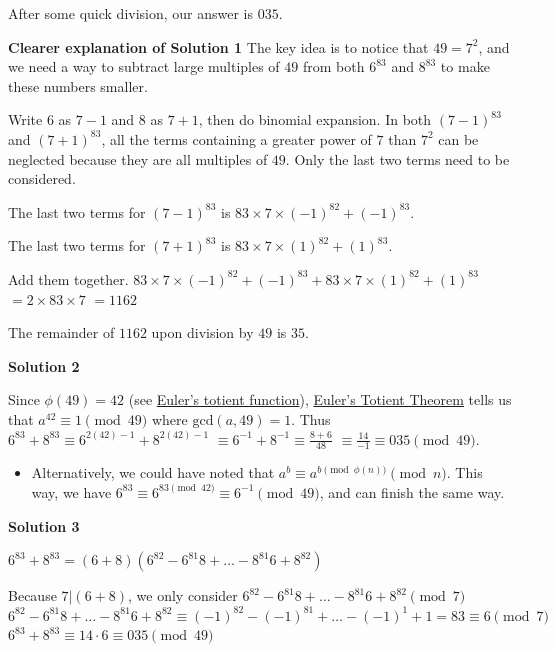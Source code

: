 \begin{enumerate}
 After some quick division, our answer is $\boxed{035}$.

 \textbf{Clearer explanation of Solution 1} The key idea is to notice that $49=7^2$, and we need a way to subtract large multiples of $49$ from both $6^{83}$ and $8^{83}$ to make these numbers smaller.

 
Write $6$ as $7-1$ and $8$ as $7+1$, then do binomial expansion. In both $(7-1)^{83}$ and $(7+1)^{83}$, all the terms containing a greater power of $7$ than $7^2$ can be neglected because they are all multiples of $49$. Only the last two terms need to be considered.

 
The last two terms for $(7-1)^{83}$ is $83\times{7}\times{(-1)^{82}}+(-1)^{83}$.

 The last two terms for $(7+1)^{83}$ is $83\times{7}\times{(1)^{82}}+(1)^{83}$.

 
Add them together. $83\times{7}\times{(-1)^{82}}+(-1)^{83}+83\times{7}\times{(1)^{82}}+(1)^{83}$
$=2\times 83\times 7$
$=1162$

 
The remainder of $1162$ upon division by $49$ is $35$.

 



\textbf{Solution 2}

Since $\phi(49) = 42$ (see \href{https://artofproblemsolving.com/wiki/index.php?title=Euler\%27s\_totient\_function}{Euler's totient function}), \href{https://artofproblemsolving.com/wiki/index.php?title=Euler\%27s\_Totient\_Theorem}{Euler's Totient Theorem} tells us that $a^{42} \equiv 1 \pmod{49}$ where $\text{gcd}(a,49) = 1$. Thus $6^{83} + 8^{83} \equiv 6^{2(42)-1}+8^{2(42)-1}$ $\equiv 6^{-1} + 8^{-1} \equiv \frac{8+6}{48}$ $\equiv \frac{14}{-1}\equiv \boxed{035} \pmod{49}$.

 
            \begin{itemize}
        \item Alternatively, we could have noted that $a^b\equiv a^{b\pmod{\phi{(n)}}}\pmod n$. This way, we have $6^{83}\equiv 6^{83\pmod {42}}\equiv 6^{-1}\pmod {49}$, and can finish the same way.
            \end{itemize}
            



\textbf{Solution 3}

$6^{83} + 8^{83} = (6+8)(6^{82}-6^{81}8+\ldots-8^{81}6+8^{82})$

 Because $7|(6+8)$, we only consider  $6^{82}-6^{81}8+\ldots-8^{81}6+8^{82}  \pmod{7}$
$6^{82}-6^{81}8+\ldots-8^{81}6+8^{82} \equiv (-1)^{82} - (-1)^{81}+ \ldots - (-1)^1 + 1 = 83 \equiv 6 \pmod{7}$
$6^{83} + 8^{83} \equiv 14 \cdot 6 \equiv \boxed{035} \pmod{49}$





\end{enumerate}
